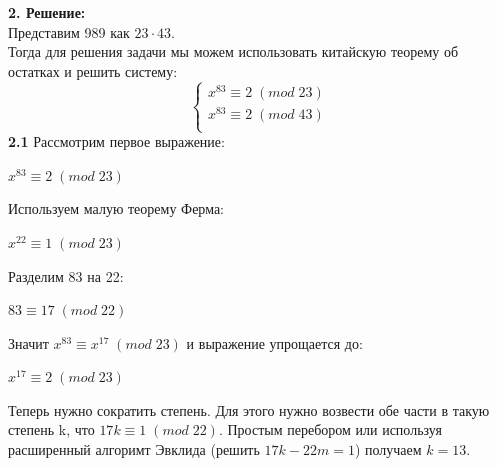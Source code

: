 \documentclass[12pt]{article}
\begin{document}
\begin{flushleft}
    \textbf{2. Решение:} \\
    \hspace{1.25cm}Представим 989 как $ 23 \cdot 43 $. \\
    \hspace{1.25cm}Тогда для решения задачи мы можем использовать китайскую теорему об остатках и решить систему: \\
    \begin{equation}
        \begin{cases}
        x^{83} \equiv 2 \; (mod \; 23) \\
        x^{83} \equiv 2 \; (mod \; 43) \\
        \end{cases}
    \end{equation}
    \hspace{1.25cm}\textbf{2.1} Рассмотрим первое выражение: \\
        \begin{center}
            $ x^{83} \equiv 2 \; (mod \; 23) $ \\
        \end{center}
    \hspace{1.25cm}Используем малую теорему Ферма: \\
        \begin{center}
            $ x^{22} \equiv 1 \; (mod \; 23) $ \\
        \end{center}
    \hspace{1.25cm}Разделим 83 на 22: \\
        \begin{center}
            $ 83 \equiv 17 \; (mod \; 22) $ \\
        \end{center}
    \hspace{1.25cm}Значит $ x^{83} \equiv x^{17} \; (mod \; 23) $ и выражение упрощается до: \\ 
        \begin{center}
            $ x^{17} \equiv 2 \; (mod \; 23) $ \\
        \end{center}
    \hspace{1.25cm}Теперь нужно сократить степень. Для этого нужно возвести обе части в
    такую степень k, что $ 17k \equiv 1 \; (mod \; 22) $. Простым перебором или
    используя расширенный алгоримт Эвклида (решить $ 17k - 22m = 1 $) получаем $ k = 13 $.\\

\end{flushleft}
\end{document}
